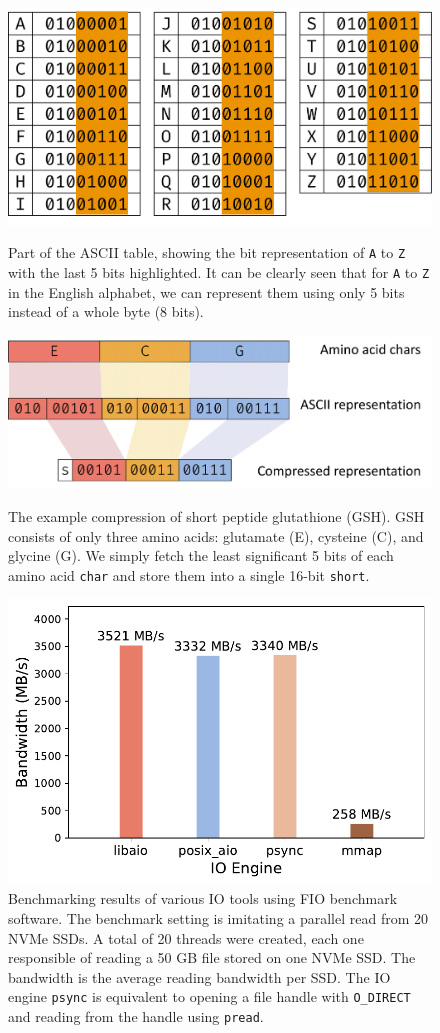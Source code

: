 \begin{figpage}
  \thispagestyle{fancy}
  \begin{figure}[htbp]
    \centering
    \includegraphics[width=.6\textwidth]{images/ASCII_prot.pdf}
    \caption{Part of the ASCII table, showing the bit representation of \texttt{A} to \texttt{Z} with the last 5 bits highlighted. It can be clearly seen that for \texttt{A} to \texttt{Z} in the English alphabet, we can represent them using only 5 bits instead of a whole byte (8 bits).}
    \label{fig:ascii_prot}
    \bigskip
    \begin{flushright}
      \includegraphics[width=.9\textwidth]{images/prot_seq_compress.pdf}
    \end{flushright}
    \caption{The example compression of short peptide glutathione (GSH). GSH consists of only three amino acids: glutamate (E), cysteine (C), and glycine (G). We simply fetch the least significant 5 bits of each amino acid \texttt{char} and store them into a single 16-bit \texttt{short}.}
    \label{fig:prot_seq_compress}
    \bigskip
    \centering
    \includegraphics[width=.65\textwidth]{images/fio_benchmark.pdf}
    \caption{Benchmarking results of various IO tools using FIO benchmark software. The benchmark setting is imitating a parallel read from 20 NVMe SSDs. A total of 20 threads were created, each one responsible of reading a 50 GB file stored on one NVMe SSD. The bandwidth is the average reading bandwidth per SSD. The IO engine \texttt{psync} is equivalent to opening a file handle with \texttt{O\_DIRECT} and reading from the handle using \texttt{pread}.}
    \label{fig:fio_benchmark}
  \end{figure}
\end{figpage}

